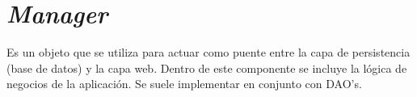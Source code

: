 \section{\textit{Manager}}

Es un objeto que se utiliza para actuar como puente entre la capa de persistencia (base de datos) y la capa web. Dentro de este componente se incluye la lógica de negocios de la aplicación. Se suele implementar en conjunto con DAO's. \cite{MNG0}